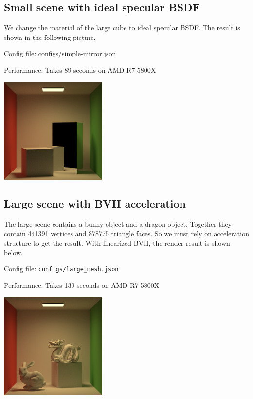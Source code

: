 \documentclass[acmtog]{acmart}
\begin{document}
\subsection{Small scene with ideal specular BSDF}

We change the material of the large cube to ideal specular BSDF. The result is shown in the following picture.

Config file: configs/simple-mirror.json

Performance: Takes 89 seconds on AMD R7 5800X

\begin{center}
	\includegraphics[width=0.4\textwidth]{rendered-results/result-small-scene-bvh-mirror-90s.png}
\end{center}


\newpage

\subsection{Large scene with BVH acceleration}

The large scene contains a bunny object and a dragon object. Together they contain 441391 vertices and 878775 triangle faces. So we must rely on acceleration structure to get the result. With linearized BVH, the render result is shown below.

Config file: \verb|configs/large_mesh.json|

Performance: Takes 139 seconds on AMD R7 5800X 
\begin{center}
	\includegraphics[width=0.4\textwidth]{rendered-results/result-large-scene-bvh-178s.png}
\end{center}
\end{document}
